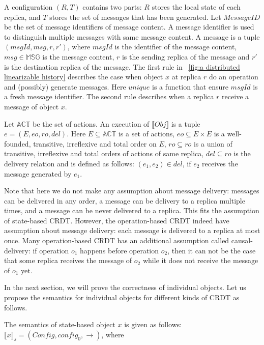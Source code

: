 A configuration $(R,T)$ contains two parts: $R$ stores the local state of each replica, and $T$ stores the set of messages that has been generated. Let $\mathit{MessageID}$ be the set of message identifiers of message content. A message identifier is used to distinguish multiple messages with same message content. A message is a tuple $(\mathit{msgId},\mathit{msg},r,r')$, where $\mathit{msgId}$ is the identifier of the message content, $\mathit{msg} \in \mathbb{MSG}$ is the message content, $r$ is the sending replica of the message and $r'$ is the destination replica of the message. The first rule in \figurename~\ref{fig:a distributed linearizable history} describes the case when object $x$ at replica $r$ do an operation and (possibly) generate messages. Here $\mathit{unique}$ is a function that ensure $\mathit{msgId}$ is a fresh message identifier. The second rule describes when a replica $r$ receive a message of object $x$.


Let $\mathbb{ACT}$ be the set of actions. An execution of $\llbracket \mathit{Obj} \rrbracket$ is a tuple $e = (E,\mathit{eo},\mathit{ro},\mathit{del})$. Here $E \subseteq \mathbb{ACT}$ is a set of actions, $\mathit{eo} \subseteq E \times E$ is a well-founded, transitive, irreflexive and total order on $E$, $\mathit{ro} \subseteq \mathit{ro}$ is a union of transitive, irreflexive and total orders of actions of same replica, $\mathit{del} \subseteq \mathit{ro}$ is the delivery relation and is defined as follows: $(e_1,e_2) \in \mathit{del}$, if $e_2$ receives the message generated by $e_1$.

Note that here we do not make any assumption about message delivery: messages can be delivered in any order, a message can be delivery to a replica multiple times, and a message can be never delivered to a replica. This fits the assumption of state-based CRDT. However, the operation-based CRDT indeed have assumption about message delivery: each message is delivered to a replica at most once. Many operation-based CRDT has an additional assumption called causal-delivery: if operation $o_1$ happens before operation $o_2$, then it can not be the case that some replica receives the message of $o_2$ while it does not receive the message of $o_1$ yet.

In the next section, we will prove the correctness of individual objects. Let us propose the semantics for individual objects for different kinds of CRDT as follows.

The semantics of state-based object $x$ is given as follows: $\llbracket x \rrbracket_{s} = (\mathit{Config},\mathit{config}_0,\rightarrow)$, where 

